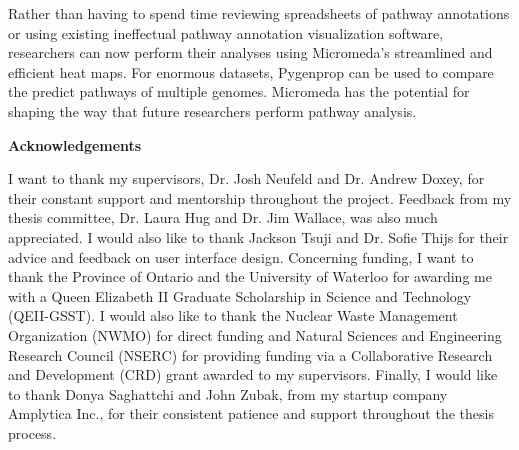 Rather than having to spend time reviewing spreadsheets of pathway annotations 
or using existing ineffectual pathway annotation visualization software, 
researchers can now perform their analyses using Micromeda's streamlined and 
efficient heat maps. For enormous datasets, Pygenprop can be used to compare the 
predict pathways of multiple genomes. Micromeda has the potential for 
shaping the way that future researchers perform pathway analysis.


\cleardoublepage


\begin{center}\textbf{Acknowledgements}\end{center}

I want to thank my supervisors, Dr. Josh Neufeld and Dr. Andrew Doxey, for their 
constant support and mentorship throughout the project. Feedback from my thesis 
committee, Dr. Laura Hug and Dr. Jim Wallace, was also much appreciated. I would 
also like to thank Jackson Tsuji and Dr. Sofie Thijs for their advice and 
feedback on user interface design. Concerning funding, I want to thank the 
Province of Ontario and the University of Waterloo for awarding me with a Queen 
Elizabeth II Graduate Scholarship in Science and Technology (QEII-GSST). I would 
also like to thank the Nuclear Waste Management Organization (NWMO) for direct 
funding and Natural Sciences and Engineering Research Council (NSERC) for 
providing funding via a Collaborative Research and Development (CRD) grant 
awarded to my supervisors. Finally, I would like to thank Donya Saghattchi and 
John Zubak, from my startup company Amplytica Inc., for their consistent 
patience and support throughout the thesis process.


\cleardoublepage

\renewcommand\contentsname{Table of Contents}
\tableofcontents
\cleardoublepage
{}    %

\listoffigures
\cleardoublepage
{}		%

\listoftables
\cleardoublepage
{}		%

\printglossaries
\cleardoublepage
{}		%


